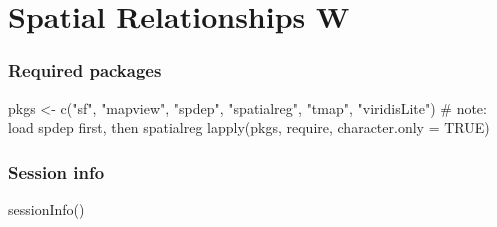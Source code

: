 \documentclass[
  letterpaper,
  DIV=11,
  numbers=noendperiod]{scrreprt}
\newenvironment{Shaded}{\begin{snugshade}}{\end{snugshade}}
\newcommand{\AttributeTok}[1]{\textcolor[rgb]{0.40,0.45,0.13}{#1}}
\newcommand{\CommentTok}[1]{\textcolor[rgb]{0.37,0.37,0.37}{#1}}
\newcommand{\ConstantTok}[1]{\textcolor[rgb]{0.56,0.35,0.01}{#1}}
\newcommand{\FunctionTok}[1]{\textcolor[rgb]{0.28,0.35,0.67}{#1}}
\newcommand{\NormalTok}[1]{\textcolor[rgb]{0.00,0.23,0.31}{#1}}
\newcommand{\OtherTok}[1]{\textcolor[rgb]{0.00,0.23,0.31}{#1}}
\newcommand{\StringTok}[1]{\textcolor[rgb]{0.13,0.47,0.30}{#1}}
\begin{document}

\hypertarget{spatial-relationships-w}{%
\chapter{Spatial Relationships W}\label{spatial-relationships-w}}

\newcommand{\Exp}{\mathrm{E}}
\newcommand\given[1][]{\:#1\vert\:}
\newcommand{\Cov}{\mathrm{Cov}}
\newcommand{\Var}{\mathrm{Var}}
\newcommand{\rank}{\mathrm{rank}}
\newcommand{\bm}[1]{\boldsymbol{\mathbf{#1}}}
\newcommand{\tr}{\mathrm{tr}}
\newcommand{\plim}{\operatornamewithlimits{plim}}
\newcommand{\diag}{\mathrm{diag}}

\hypertarget{required-packages-2}{%
\subsection*{Required packages}\label{required-packages-2}}

\begin{Shaded}
\begin{Highlighting}[]
\NormalTok{pkgs }\OtherTok{\textless{}{-}} \FunctionTok{c}\NormalTok{(}\StringTok{"sf"}\NormalTok{, }\StringTok{"mapview"}\NormalTok{, }\StringTok{"spdep"}\NormalTok{, }\StringTok{"spatialreg"}\NormalTok{, }\StringTok{"tmap"}\NormalTok{, }\StringTok{"viridisLite"}\NormalTok{) }\CommentTok{\# note: load spdep first, then spatialreg}
\FunctionTok{lapply}\NormalTok{(pkgs, require, }\AttributeTok{character.only =} \ConstantTok{TRUE}\NormalTok{)}
\end{Highlighting}
\end{Shaded}

\hypertarget{session-info-2}{%
\subsection*{Session info}\label{session-info-2}}

\begin{Shaded}
\begin{Highlighting}[]
\FunctionTok{sessionInfo}\NormalTok{()}
\end{Highlighting}
\end{Shaded}
\end{document}
